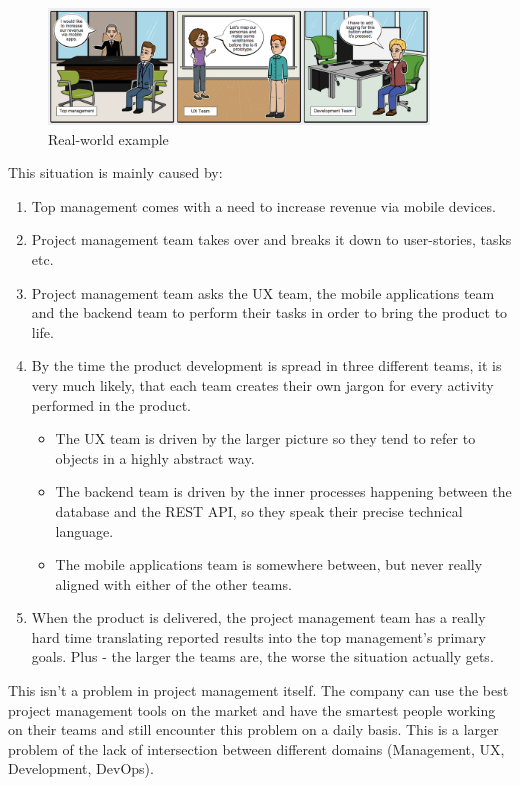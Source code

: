 \begin{figure}[!ht]
	\centering
	\includegraphics[width=0.9\textwidth]{figures/storyboard}
    \caption{Real-world example}
\end{figure}

This situation is mainly caused by:

\begin{enumerate}
	\item Top management comes with a need to increase revenue via mobile devices.
	\item Project management team takes over and breaks it down to user-stories, tasks etc.
	\item Project management team asks the UX team, the mobile applications team and the backend team to perform their tasks in order to bring the product to life.
	\item By the time the product development is spread in three different teams, it is very much likely, that each team creates their own jargon for every activity performed in the product.
		\begin{itemize}
			\item The UX team is driven by the larger picture so they tend to refer to objects in a highly abstract way.
			\item The backend team is driven by the inner processes happening between the database and the REST API, so they speak their precise technical language.
			\item The mobile applications team is somewhere between, but never really aligned with either of the other teams.
		\end{itemize}
	\item When the product is delivered, the project management team has a really hard time translating reported results into the top management's primary goals. Plus - the larger the teams are, the worse the situation actually gets.
\end{enumerate}

This isn't a problem in project management itself. The company can use the best project management tools on the market and have the smartest people working on their teams and still encounter this problem on a daily basis. This is a larger problem of the lack of intersection between different domains (Management, UX, Development, DevOps).

